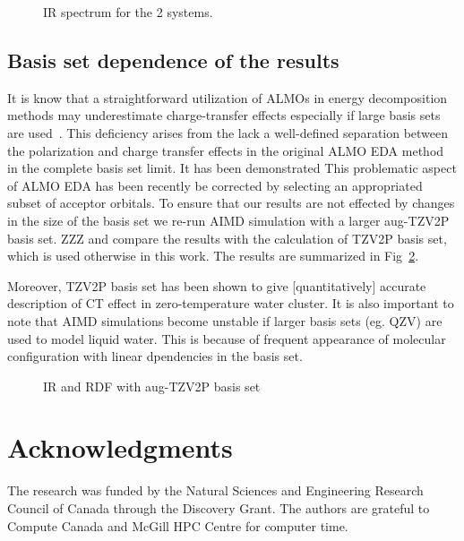 \documentclass[aps,prl,reprint,amsmath,amssymb]{revtex4-1}
\begin{document}
\begin{figure}
\caption{IR spectrum for the 2 systems.}\label{Fig:ir_cp}
\end{figure} 

\subsection{Basis set dependence of the results}

It is know that a straightforward utilization of ALMOs in energy decomposition methods may underestimate charge-transfer effects especially if large basis sets are used~\cite{horn2015polarization,herbert2016}. This deficiency arises from the lack a well-defined separation between the polarization and charge transfer effects in the original ALMO EDA method~\cite{khaliullin2007unravelling} in the complete basis set limit. It has been demonstrated This problematic aspect of ALMO EDA has been recently be corrected by selecting an appropriated subset of acceptor orbitals\cite{horn2015polarization}. To ensure that our results are not effected by changes in the size of the basis set we re-run AIMD simulation with a larger aug-TZV2P basis set. ZZZ and compare the results with the calculation of TZV2P basis set, which is used otherwise in this work. The results are summarized in Fig~\ref{Fig:basis}.

Moreover, TZV2P basis set has been shown to give [quantitatively] accurate description of CT effect in zero-temperature water cluster. It is also important to note that AIMD simulations become unstable if larger basis sets (eg. QZV) are used to model liquid water. This is because of frequent appearance of molecular configuration with linear dpendencies in the basis set.

\begin{figure}
\caption{IR and RDF with aug-TZV2P basis set}\label{Fig:basis}
\end{figure} 

\section{Acknowledgments} 

The research was funded by the Natural Sciences and Engineering Research Council of Canada through the Discovery Grant. The authors are grateful to Compute Canada and McGill HPC Centre for computer time.


\end{document}

